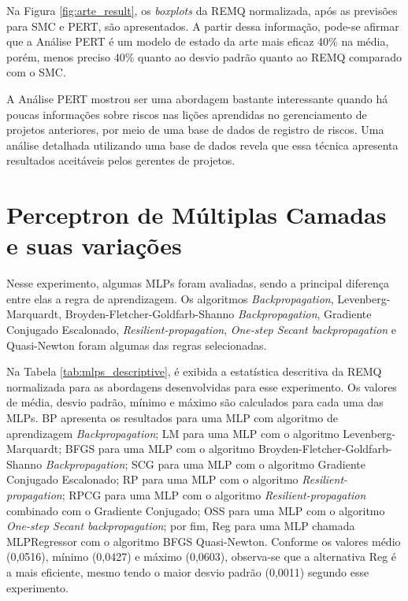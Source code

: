 Na Figura \ref{fig:arte_result}, os \textit{boxplots} da REMQ normalizada, após as previsões para SMC e PERT, são apresentados. A partir dessa informação, pode-se afirmar que a Análise PERT é um modelo de estado da arte mais eficaz 40\% na média, porém, menos preciso 40\% quanto ao desvio padrão quanto ao REMQ comparado com o SMC.

A Análise PERT mostrou ser uma abordagem bastante interessante quando há poucas informações sobre riscos nas lições aprendidas no gerenciamento de projetos anteriores, por meio de uma base de dados de registro de riscos. Uma análise detalhada utilizando uma base de dados revela que essa técnica apresenta resultados aceitáveis pelos gerentes de projetos.

\section{Perceptron de Múltiplas Camadas e suas variações}

Nesse experimento, algumas MLPs foram avaliadas, sendo a principal diferença entre elas a regra de aprendizagem. Os algoritmos \textit{Backpropagation}, Levenberg-Marquardt, Broyden-Fletcher-Goldfarb-Shanno \textit{Backpropagation}, Gradiente Conjugado Escalonado, \textit{Resilient-propagation}, \textit{One-step Secant backpropagation} e Quasi-Newton foram algumas das regras selecionadas.

Na Tabela \ref{tab:mlps_descriptive}, é exibida a estatística descritiva da REMQ normalizada para as abordagens desenvolvidas para esse experimento. Os valores de média, desvio padrão, mínimo e máximo são calculados para cada uma das MLPs. BP apresenta os resultados para uma MLP com algoritmo de aprendizagem \textit{Backpropagation}; LM para uma MLP com o algoritmo Levenberg-Marquardt; BFGS para uma MLP com o algoritmo Broyden-Fletcher-Goldfarb-Shanno \textit{Backpropagation}; SCG para uma MLP com o algoritmo Gradiente Conjugado Escalonado; RP para uma MLP com o algoritmo \textit{Resilient-propagation}; RPCG para uma MLP com o algoritmo \textit{Resilient-propagation} combinado com o Gradiente Conjugado; OSS para uma MLP com o algoritmo \textit{One-step Secant backpropagation}; por fim, Reg para uma MLP chamada MLPRegressor com o algoritmo BFGS Quasi-Newton. Conforme os valores médio (0,0516), mínimo (0,0427) e máximo (0,0603), observa-se que a alternativa Reg é a mais eficiente, mesmo tendo o maior desvio padrão (0,0011) segundo esse experimento.

